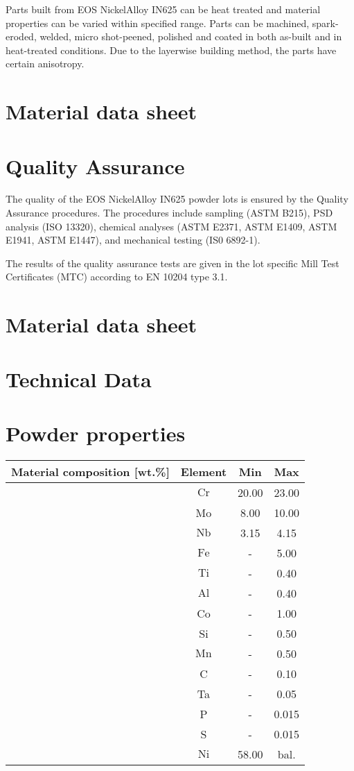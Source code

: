 \documentclass[10pt]{article}
\begin{document}
Parts built from EOS NickelAlloy IN625 can be heat treated and material properties can be varied within specified range. Parts can be machined, spark-eroded, welded, micro shot-peened, polished and coated in both as-built and in heat-treated conditions. Due to the layerwise building method, the parts have certain anisotropy.

\section*{Material data sheet}
\section*{Quality Assurance}
The quality of the EOS NickelAlloy IN625 powder lots is ensured by the Quality Assurance procedures. The procedures include sampling (ASTM B215), PSD analysis (ISO 13320), chemical analyses (ASTM E2371, ASTM E1409, ASTM E1941, ASTM E1447), and mechanical testing (IS0 6892-1).

The results of the quality assurance tests are given in the lot specific Mill Test Certificates (MTC) according to EN 10204 type 3.1.

\section*{Material data sheet}
\section*{Technical Data}
\section*{Powder properties}
\begin{center}
\begin{tabular}{|c|c|c|c|}
\hline
Material composition [wt.\%] & Element & Min & Max \\
\hline
 & $\mathrm{Cr}$ & 20.00 & 23.00 \\
\hline
 & Mo & 8.00 & 10.00 \\
\hline
 & $\mathrm{Nb}$ & 3.15 & 4.15 \\
\hline
 & $\mathrm{Fe}$ & - & 5.00 \\
\hline
 & $\mathrm{Ti}$ & - & 0.40 \\
\hline
 & $\mathrm{Al}$ & - & 0.40 \\
\hline
 & Co & - & 1.00 \\
\hline
 & Si & - & 0.50 \\
\hline
 & $\mathrm{Mn}$ & - & 0.50 \\
\hline
 & C & - & 0.10 \\
\hline
 & Ta & - & 0.05 \\
\hline
 & P & - & 0.015 \\
\hline
 & S & - & 0.015 \\
\hline
 & $\mathrm{Ni}$ & 58.00 & bal. \\
\hline
\end{tabular}
\end{center}
\end{document}
